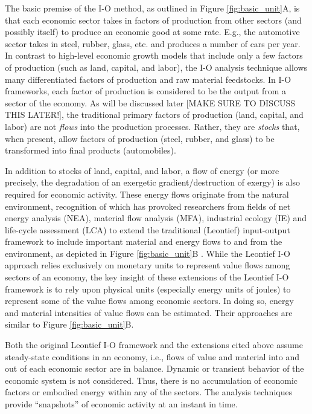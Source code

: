 \documentclass[authoryear,preprint,review,12pt]{elsarticle}
\begin{document}
The basic premise of the I-O method, as outlined in Figure \ref{fig:basic_unit}A, is that each economic sector takes in factors of production from other sectors (and possibly itself) to produce an economic good at some rate. E.g., the automotive sector takes in steel, rubber, glass, etc. and produces a number of cars per year. In contrast to high-level economic growth models that include only a few factors of production (such as land, capital, and labor), the I-O analysis technique allows many differentiated factors of production and raw material feedstocks. \cite{Costanza1980} In I-O frameworks, each factor of production is considered to be the output from a sector of the economy. As will be discussed later [MAKE SURE TO DISCUSS THIS LATER!], the traditional primary factors of production (land, capital, and labor) are not \emph{flows} into the production processes. Rather, they are \emph{stocks} that, when present, allow factors of production (steel, rubber, and glass) to be transformed into final products (automobiles).

In addition to stocks of land, capital, and labor, a flow of energy (or more precisely, the degradation of an exergetic gradient/destruction of exergy) is also required for economic activity. These energy flows originate from the natural environment, recognition of which has provoked researchers from fields of net energy analysis (NEA), material flow analysis (MFA), industrial ecology (IE) and life-cycle assessment (LCA) to extend the traditional (Leontief) input-output framework to include important material and energy flows to and from the environment, as depicted in Figure \ref{fig:basic_unit}B \cite{Carter1974,Bullard1975, Bullard1978, Herendeen1978, Costanza1980, Casler1984, Joshi1999, Suh2009}. While the Leontief I-O approach relies exclusively on monetary units to represent value flows among sectors of an economy, the key insight of these extensions of the Leontief I-O framework is to rely upon physical units (especially energy units of joules) to represent some of the value flows among economic sectors. In doing so, energy and material intensities of value flows can be estimated. Their approaches are similar to Figure \ref{fig:basic_unit}B. 

Both the original Leontief I-O framework and the extensions cited above assume steady-state conditions in an economy, i.e., flows of value and material into and out of each economic sector are in balance. Dynamic or transient behavior of the economic system is not considered. Thus, there is no accumulation of economic factors or embodied energy within any of the sectors. The analysis techniques provide ``snapshots'' of economic activity at an instant in time.
\end{document}
